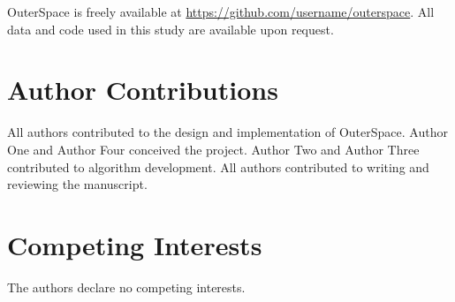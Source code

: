 \documentclass[9pt,twocolumn,twoside]{extarticle}
\begin{document}
OuterSpace is freely available at \url{https://github.com/username/outerspace}.
All data and code used in this study are available upon request.

\section*{Author Contributions}

All authors contributed to the design and implementation of OuterSpace. Author One and Author Four conceived the project. Author Two and Author Three contributed to algorithm development. All authors contributed to writing and reviewing the manuscript.

\section*{Competing Interests}

The authors declare no competing interests.



\end{document}
